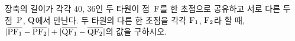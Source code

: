 장축의 길이가 각각 $40$, $36$인 두 타원이 점~$\mathrm{F}$를 한 초점으로 공유하고 서로 다른 두 점~$\mathrm{P}$, $\mathrm{Q}$에서 만난다. 두 타원의 다른 한 초점을 각각 $\mathrm{F}_1$, $\mathrm{F}_2$라 할 때, $|\overline{\mathrm{PF_1}}-\overline{\mathrm{PF_2}}|+|\overline{\mathrm{QF_1}}-\overline{\mathrm{QF_2}}|$의 값을 구하시오.
